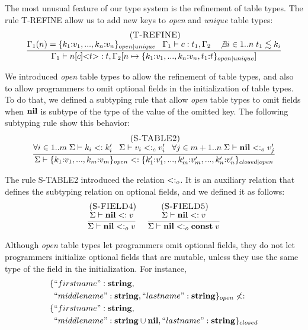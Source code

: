 The most unusual feature of our type system is the refinement of
table types.
The rule \textsc{T-REFINE} allow us to add new keys to \emph{open}
and \emph{unique} table types:
\[
\begin{array}{c}
\; (\textsc{T-REFINE})\\
\dfrac{\Gamma_{1}(n) = \{ k_{1}{:}v_{1}, ..., k_{n}{:}v_{n} \}_{open|unique} \;\;\;
       \Gamma_{1} \vdash c:t_{1}, \Gamma_{2} \;\;\;
       \not \exists i \in 1..n \; t_{1} \lesssim k_{i}}
      {\Gamma_{1} \vdash n[c] {<}t{>}:t, \Gamma_{2}[n \mapsto \{ k_{1}{:}v_{1}, ..., k_{n}{:}v_{n}, t_{1}{:}t\}_{open|unique}]}
\end{array}
\]

We introduced \emph{open} table types to allow the refinement
of table types, and also to allow programmers to omit optional
fields in the initialization of table types.
To do that, we defined a subtyping rule that allow \emph{open}
table types to omit fields when $\mathbf{nil}$ is subtype of the type of
the value of the omitted key.
The following subtyping rule show this behavior:
\[
\begin{array}{c}
\; (\textsc{S-TABLE2})\\
\dfrac{\forall i \in 1..m \; \Sigma \vdash k_{i} <: k_{i}' \;\;\;
       \Sigma \vdash v_{i} <:_{c} v_{i}' \;\;\;
       \forall j \in m+1..n \; \Sigma \vdash \mathbf{nil} <:_{o} v_{j}'}
      {\Sigma \vdash \{k_{1}{:}v_{1}, ..., k_{m}{:}v_{m}\}_{open} <:
                    \{k_{1}'{:}v_{1}', ..., k_{m}'{:}v_{m}', ..., k_{n}'{:}v_{n}'\}_{closed|open}}
\end{array}
\]

The rule \textsc{S-TABLE2} introduced the relation $<:_{o}$.
It is an auxiliary relation that defines the subtyping relation
on optional fields, and we defined it as follows:
\[
\begin{array}{c}
\begin{array}{c}
\; (\textsc{S-FIELD4})\\
\dfrac{\Sigma \vdash \mathbf{nil} <: v}
      {\Sigma \vdash \mathbf{nil} <:_{o} v}
\end{array}
\;
\begin{array}{c}
\; (\textsc{S-FIELD5})\\
\dfrac{\Sigma \vdash \mathbf{nil} <: v}
      {\Sigma \vdash \mathbf{nil} <:_{o} \mathbf{const} \; v}
\end{array}
\end{array}
\]

Although \emph{open} table types let programmers omit optional fields,
they do not let programmers initialize optional fields that are
mutable, unless they use the same type of the field in the initialization.
For instance,
\begin{align*}
\{ & ``firstname":\mathbf{string},\\
   & ``middlename":\mathbf{string}, ``lastname":\mathbf{string} \}_{open} \not <: \\
\{ & ``firstname":\mathbf{string}, \\
   & ``middlename":\mathbf{string} \cup \mathbf{nil}, ``lastname":\mathbf{string} \}_{closed}
\end{align*}

